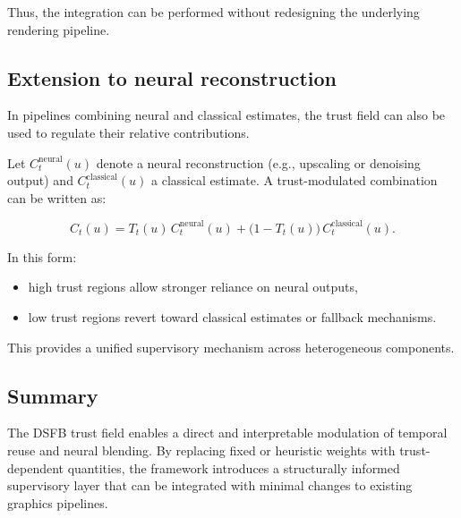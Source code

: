 \documentclass[11pt]{article}
\theoremstyle{definition}
\theoremstyle{plain}
\begin{document}
Thus, the integration can be performed without redesigning the underlying rendering pipeline.


\subsection{Extension to neural reconstruction}

In pipelines combining neural and classical estimates, the trust field can also be used to regulate their relative contributions.

Let $C_t^{\mathrm{neural}}(u)$ denote a neural reconstruction (e.g., upscaling or denoising output) and $C_t^{\mathrm{classical}}(u)$ a classical estimate. A trust-modulated combination can be written as:

\begin{equation}
C_t(u) = T_t(u)\, C_t^{\mathrm{neural}}(u)
+ \bigl(1 - T_t(u)\bigr)\, C_t^{\mathrm{classical}}(u).
\end{equation}

In this form:

\begin{itemize}[leftmargin=1.5em]
    \item high trust regions allow stronger reliance on neural outputs,
    \item low trust regions revert toward classical estimates or fallback mechanisms.
\end{itemize}

This provides a unified supervisory mechanism across heterogeneous components.


\subsection{Summary}

The DSFB trust field enables a direct and interpretable modulation of temporal reuse and neural blending. By replacing fixed or heuristic weights with trust-dependent quantities, the framework introduces a structurally informed supervisory layer that can be integrated with minimal changes to existing graphics pipelines.
\end{document}
